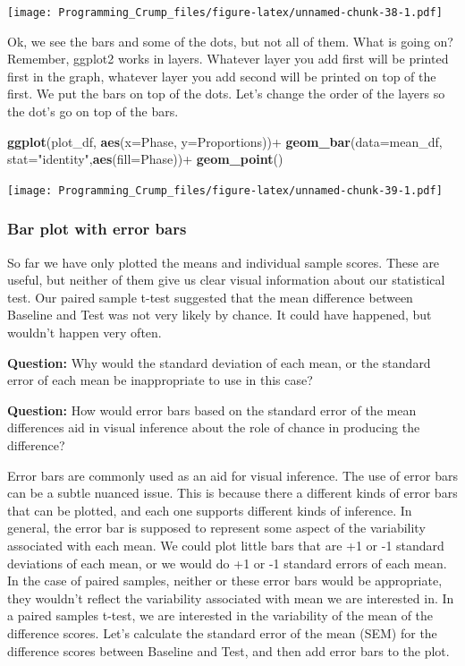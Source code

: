 \documentclass[]{book}
\newenvironment{Shaded}{\begin{snugshade}}{\end{snugshade}}
\newcommand{\KeywordTok}[1]{\textcolor[rgb]{0.13,0.29,0.53}{\textbf{{#1}}}}
\newcommand{\DataTypeTok}[1]{\textcolor[rgb]{0.13,0.29,0.53}{{#1}}}
\newcommand{\StringTok}[1]{\textcolor[rgb]{0.31,0.60,0.02}{{#1}}}
\newcommand{\NormalTok}[1]{{#1}}
\theoremstyle{definition}
\theoremstyle{definition}
\theoremstyle{definition}
\theoremstyle{remark}
\begin{document}
\texttt{[image: Programming\_Crump\_files/figure-latex/unnamed-chunk-38-1.pdf]}

Ok, we see the bars and some of the dots, but not all of them. What is
going on? Remember, ggplot2 works in layers. Whatever layer you add
first will be printed first in the graph, whatever layer you add second
will be printed on top of the first. We put the bars on top of the dots.
Let's change the order of the layers so the dot's go on top of the bars.

\begin{Shaded}
\begin{Highlighting}[]
\KeywordTok{ggplot}\NormalTok{(plot_df, }\KeywordTok{aes}\NormalTok{(}\DataTypeTok{x=}\NormalTok{Phase, }\DataTypeTok{y=}\NormalTok{Proportions))+}\StringTok{ }
\StringTok{  }\KeywordTok{geom_bar}\NormalTok{(}\DataTypeTok{data=}\NormalTok{mean_df, }\DataTypeTok{stat=}\StringTok{"identity"}\NormalTok{,}\KeywordTok{aes}\NormalTok{(}\DataTypeTok{fill=}\NormalTok{Phase))+}
\StringTok{  }\KeywordTok{geom_point}\NormalTok{()}
\end{Highlighting}
\end{Shaded}

\texttt{[image: Programming\_Crump\_files/figure-latex/unnamed-chunk-39-1.pdf]}

\subsubsection{Bar plot with error bars}\label{bar-plot-with-error-bars}

So far we have only plotted the means and individual sample scores.
These are useful, but neither of them give us clear visual information
about our statistical test. Our paired sample t-test suggested that the
mean difference between Baseline and Test was not very likely by chance.
It could have happened, but wouldn't happen very often.

\textbf{Question:} Why would the standard deviation of each mean, or the
standard error of each mean be inappropriate to use in this case?

\textbf{Question:} How would error bars based on the standard error of
the mean differences aid in visual inference about the role of chance in
producing the difference?

Error bars are commonly used as an aid for visual inference. The use of
error bars can be a subtle nuanced issue. This is because there a
different kinds of error bars that can be plotted, and each one supports
different kinds of inference. In general, the error bar is supposed to
represent some aspect of the variability associated with each mean. We
could plot little bars that are +1 or -1 standard deviations of each
mean, or we would do +1 or -1 standard errors of each mean. In the case
of paired samples, neither or these error bars would be appropriate,
they wouldn't reflect the variability associated with mean we are
interested in. In a paired samples t-test, we are interested in the
variability of the mean of the difference scores. Let's calculate the
standard error of the mean (SEM) for the difference scores between
Baseline and Test, and then add error bars to the plot.
\end{document}
